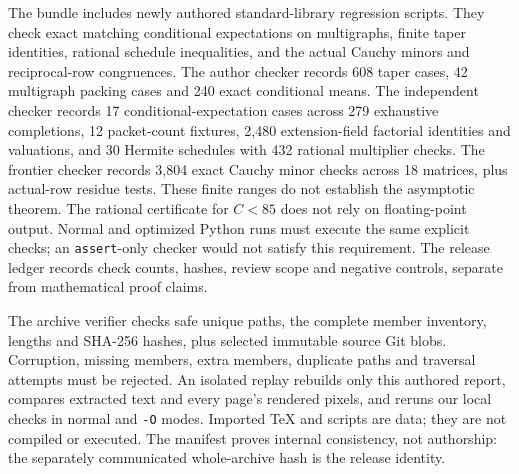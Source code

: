 \documentclass[11pt,letterpaper]{article}
\begin{document}
The bundle includes newly authored standard-library regression scripts. They check exact
matching conditional expectations on multigraphs, finite taper identities, rational schedule
inequalities, and the actual Cauchy minors and reciprocal-row congruences.
The author checker records 608 taper cases, 42 multigraph packing cases and 240 exact conditional means. The independent checker records 17 conditional-expectation cases across 279 exhaustive completions, 12 packet-count fixtures, 2,480 extension-field factorial identities and valuations, and 30 Hermite schedules with 432 rational multiplier checks. The frontier checker records 3,804 exact Cauchy minor checks across 18 matrices, plus actual-row residue tests. These finite ranges do not establish the asymptotic theorem.
The rational certificate for $C<85$ does not rely on floating-point output.
Normal and optimized Python runs must execute the same explicit checks; an \texttt{assert}-only
checker would not satisfy this requirement. The release ledger records check counts, hashes,
review scope and negative controls, separate from mathematical proof claims.

The archive verifier checks safe unique paths, the complete member inventory, lengths and
SHA-256 hashes, plus selected immutable source Git blobs. Corruption, missing members, extra
members, duplicate paths and traversal attempts must be rejected. An isolated replay rebuilds
only this authored report, compares extracted text and every page's rendered pixels, and reruns
our local checks in normal and \texttt{-O} modes. Imported TeX and scripts are data; they are not
compiled or executed. The manifest proves internal consistency, not authorship: the separately
communicated whole-archive hash is the release identity.
\end{document}
